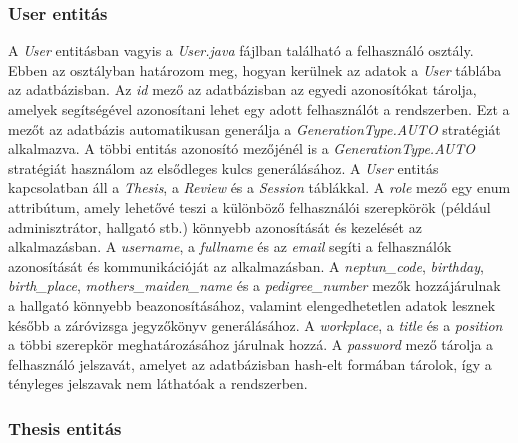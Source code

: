 \subsubsection{User entitás}

A \textit{User} entitásban vagyis a \textit{User.java} fájlban található a felhasználó osztály. Ebben az osztályban határozom meg, hogyan kerülnek az adatok a \textit{User} táblába az adatbázisban. Az \textit{id} mező az adatbázisban az egyedi azonosítókat tárolja, amelyek segítségével azonosítani lehet egy adott felhasználót a rendszerben. Ezt a mezőt az adatbázis automatikusan generálja a \textit{GenerationType.AUTO} stratégiát alkalmazva. A többi entitás azonosító mezőjénél is a \textit{GenerationType.AUTO} stratégiát használom az elsődleges kulcs generálásához. A \textit{User} entitás kapcsolatban áll a \textit{Thesis}, a \textit{Review} és a \textit{Session} táblákkal. A \textit{role} mező egy enum attribútum, amely lehetővé teszi a különböző felhasználói szerepkörök (például adminisztrátor, hallgató stb.) könnyebb azonosítását és kezelését az alkalmazásban. A \textit{username}, a \textit{fullname} és az \textit{email} segíti a felhasználók azonosítását és kommunikációját az alkalmazásban. A \textit{neptun\_code}, \textit{birthday}, \textit{birth\_place}, \textit{mothers\_maiden\_name} és a \textit{pedigree\_number} mezők hozzájárulnak a hallgató könnyebb beazonosításához, valamint elengedhetetlen adatok lesznek később a záróvizsga jegyzőkönyv generálásához. A \textit{workplace}, a \textit{title} és a \textit{position} a többi szerepkör meghatározásához járulnak hozzá. A \textit{password} mező tárolja a felhasználó jelszavát, amelyet az adatbázisban hash-elt formában tárolok, így a tényleges jelszavak nem láthatóak a rendszerben.


\subsubsection{Thesis entitás}

